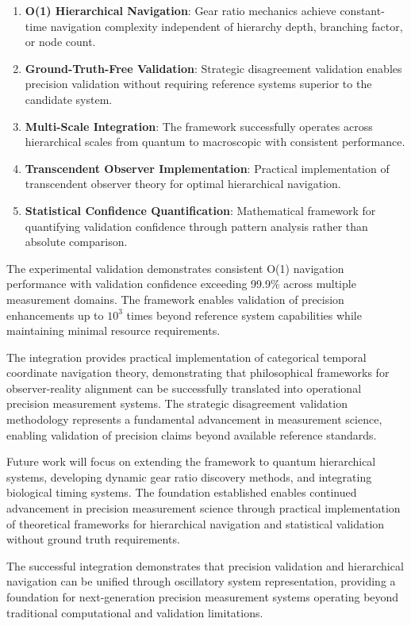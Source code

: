 \documentclass[12pt,a4paper]{article}
\begin{document}
\begin{enumerate}
\item \textbf{O(1) Hierarchical Navigation}: Gear ratio mechanics achieve constant-time navigation complexity independent of hierarchy depth, branching factor, or node count.

\item \textbf{Ground-Truth-Free Validation}: Strategic disagreement validation enables precision validation without requiring reference systems superior to the candidate system.

\item \textbf{Multi-Scale Integration}: The framework successfully operates across hierarchical scales from quantum to macroscopic with consistent performance.

\item \textbf{Transcendent Observer Implementation}: Practical implementation of transcendent observer theory for optimal hierarchical navigation.

\item \textbf{Statistical Confidence Quantification}: Mathematical framework for quantifying validation confidence through pattern analysis rather than absolute comparison.
\end{enumerate}

The experimental validation demonstrates consistent O(1) navigation performance with validation confidence exceeding 99.9\% across multiple measurement domains. The framework enables validation of precision enhancements up to $10^3$ times beyond reference system capabilities while maintaining minimal resource requirements.

The integration provides practical implementation of categorical temporal coordinate navigation theory, demonstrating that philosophical frameworks for observer-reality alignment can be successfully translated into operational precision measurement systems. The strategic disagreement validation methodology represents a fundamental advancement in measurement science, enabling validation of precision claims beyond available reference standards.

Future work will focus on extending the framework to quantum hierarchical systems, developing dynamic gear ratio discovery methods, and integrating biological timing systems. The foundation established enables continued advancement in precision measurement science through practical implementation of theoretical frameworks for hierarchical navigation and statistical validation without ground truth requirements.

The successful integration demonstrates that precision validation and hierarchical navigation can be unified through oscillatory system representation, providing a foundation for next-generation precision measurement systems operating beyond traditional computational and validation limitations.
\end{document}

